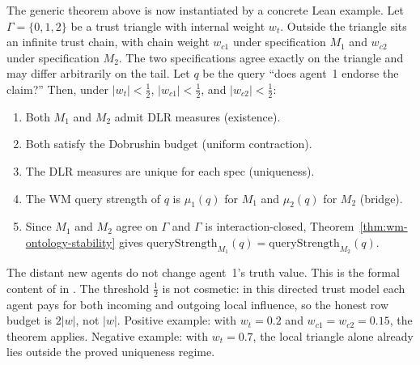 \documentclass[11pt,openany]{report}
\begin{document}
\noindent
The generic theorem above is now instantiated by a concrete Lean example.
Let $\Gamma = \{0,1,2\}$ be a trust triangle with internal weight $w_t$.
Outside the triangle sits an infinite trust chain, with chain weight $w_{c1}$
under specification $M_1$ and $w_{c2}$ under specification $M_2$.  The two
specifications agree exactly on the triangle and may differ arbitrarily on the
tail.  Let $q$ be the query ``does agent~1 endorse the claim?''  Then, under
$|w_t|<\tfrac12$, $|w_{c1}|<\tfrac12$, and $|w_{c2}|<\tfrac12$:
\begin{enumerate}
\item Both $M_1$ and $M_2$ admit DLR measures (existence).
\item Both satisfy the Dobrushin budget (uniform contraction).
\item The DLR measures are unique for each spec (uniqueness).
\item The WM query strength of $q$ is $\mu_1(q)$ for $M_1$ and $\mu_2(q)$
  for $M_2$ (bridge).
\item Since $M_1$ and $M_2$ agree on $\Gamma$ and $\Gamma$ is
  interaction-closed, Theorem~\ref{thm:wm-ontology-stability} gives
  $\mathrm{queryStrength}_{M_1}(q) = \mathrm{queryStrength}_{M_2}(q)$.
\end{enumerate}
The distant new agents do not change agent~1's truth value.  This is the
formal content of
 in
.
The threshold $\tfrac12$ is not cosmetic: in this directed trust model each
agent pays for both incoming and outgoing local influence, so the honest row
budget is $2|w|$, not $|w|$.  Positive example: with $w_t = 0.2$ and
$w_{c1}=w_{c2}=0.15$, the theorem applies.  Negative example: with
$w_t = 0.7$, the local triangle alone already lies outside the proved
uniqueness regime.
\end{document}
